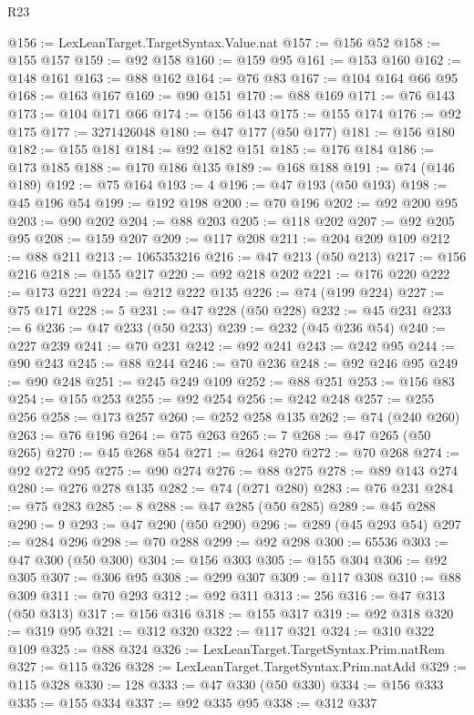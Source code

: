\begin{lexlean}{R23}
\begin{coremodule}
@156 := LexLeanTarget.TargetSyntax.Value.nat
@157 := @156 @52
@158 := @155 @157
@159 := @92 @158
@160 := @159 @95
@161 := @153 @160
@162 := @148 @161
@163 := @88 @162
@164 := @76 @83
@167 := @104 @164 @66 @95
@168 := @163 @167
@169 := @90 @151
@170 := @88 @169
@171 := @76 @143
@173 := @104 @171 @66
@174 := @156 @143
@175 := @155 @174
@176 := @92 @175
@177 := 3271426048
@180 := @47 @177 (@50 @177)
@181 := @156 @180
@182 := @155 @181
@184 := @92 @182 @151
@185 := @176 @184
@186 := @173 @185
@188 := @170 @186 @135
@189 := @168 @188
@191 := @74 (@146 @189)
@192 := @75 @164
@193 := 4
@196 := @47 @193 (@50 @193)
@198 := @45 @196 @54
@199 := @192 @198
@200 := @70 @196
@202 := @92 @200 @95
@203 := @90 @202
@204 := @88 @203
@205 := @118 @202
@207 := @92 @205 @95
@208 := @159 @207
@209 := @117 @208
@211 := @204 @209 @109
@212 := @88 @211
@213 := 1065353216
@216 := @47 @213 (@50 @213)
@217 := @156 @216
@218 := @155 @217
@220 := @92 @218 @202
@221 := @176 @220
@222 := @173 @221
@224 := @212 @222 @135
@226 := @74 (@199 @224)
@227 := @75 @171
@228 := 5
@231 := @47 @228 (@50 @228)
@232 := @45 @231
@233 := 6
@236 := @47 @233 (@50 @233)
@239 := @232 (@45 @236 @54)
@240 := @227 @239
@241 := @70 @231
@242 := @92 @241
@243 := @242 @95
@244 := @90 @243
@245 := @88 @244
@246 := @70 @236
@248 := @92 @246 @95
@249 := @90 @248
@251 := @245 @249 @109
@252 := @88 @251
@253 := @156 @83
@254 := @155 @253
@255 := @92 @254
@256 := @242 @248
@257 := @255 @256
@258 := @173 @257
@260 := @252 @258 @135
@262 := @74 (@240 @260)
@263 := @76 @196
@264 := @75 @263
@265 := 7
@268 := @47 @265 (@50 @265)
@270 := @45 @268 @54
@271 := @264 @270
@272 := @70 @268
@274 := @92 @272 @95
@275 := @90 @274
@276 := @88 @275
@278 := @89 @143 @274
@280 := @276 @278 @135
@282 := @74 (@271 @280)
@283 := @76 @231
@284 := @75 @283
@285 := 8
@288 := @47 @285 (@50 @285)
@289 := @45 @288
@290 := 9
@293 := @47 @290 (@50 @290)
@296 := @289 (@45 @293 @54)
@297 := @284 @296
@298 := @70 @288
@299 := @92 @298
@300 := 65536
@303 := @47 @300 (@50 @300)
@304 := @156 @303
@305 := @155 @304
@306 := @92 @305
@307 := @306 @95
@308 := @299 @307
@309 := @117 @308
@310 := @88 @309
@311 := @70 @293
@312 := @92 @311
@313 := 256
@316 := @47 @313 (@50 @313)
@317 := @156 @316
@318 := @155 @317
@319 := @92 @318
@320 := @319 @95
@321 := @312 @320
@322 := @117 @321
@324 := @310 @322 @109
@325 := @88 @324
@326 := LexLeanTarget.TargetSyntax.Prim.natRem
@327 := @115 @326
@328 := LexLeanTarget.TargetSyntax.Prim.natAdd
@329 := @115 @328
@330 := 128
@333 := @47 @330 (@50 @330)
@334 := @156 @333
@335 := @155 @334
@337 := @92 @335 @95
@338 := @312 @337

\end{coremodule}
\end{lexlean}
